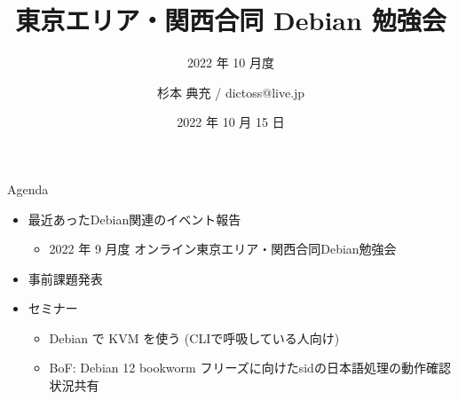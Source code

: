 \title{東京エリア・関西合同 Debian 勉強会}
\subtitle{2022 年 10 月度} %
\author{杉本 典充 / dictoss@live.jp}
\date{2022 年 10 月 15 日}



\begin{frame}
\titlepage{}
\end{frame}

\begin{frame}{Agenda}
 \begin{minipage}[t]{0.45\hsize}
  \begin{itemize}
  \item 最近あったDebian関連のイベント報告
    \begin{itemize}
    \item 2022 年 9 月度 オンライン東京エリア・関西合同Debian勉強会
    \end{itemize}
  \item 事前課題発表
  \end{itemize}
 \end{minipage}
 \begin{minipage}[t]{0.45\hsize}
   \begin{itemize}
   \item セミナー
     \begin{itemize}
     \item Debian で KVM を使う (CLIで呼吸している人向け)
     \item BoF: Debian 12 bookworm フリーズに向けたsidの日本語処理の動作確認状況共有
     \end{itemize}
  \end{itemize}
 \end{minipage}
\end{frame}

